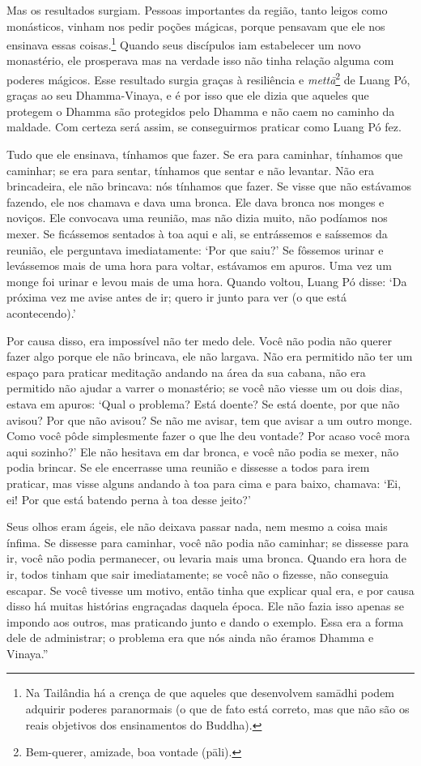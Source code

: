 Mas os resultados surgiam. Pessoas importantes da região, tanto leigos
como monásticos, vinham nos pedir poções mágicas, porque pensavam que
ele nos ensinava essas coisas.\footnote{Na Tailândia há a crença de que
  aqueles que desenvolvem samādhi podem adquirir poderes paranormais (o
  que de fato está correto, mas que não são os reais objetivos dos
  ensinamentos do Buddha).} Quando seus discípulos iam estabelecer um
novo monastério, ele prosperava mas na verdade isso não tinha relação
alguma com poderes mágicos. Esse resultado surgia graças à resiliência e
\emph{mettā}\footnote{Bem-querer, amizade, boa vontade (pāli).} de Luang
Pó, graças ao seu Dhamma-Vinaya, e é por isso que ele dizia que aqueles
que protegem o Dhamma são protegidos pelo Dhamma e não caem no caminho
da maldade. Com certeza será assim, se conseguirmos praticar como Luang
Pó fez.

Tudo que ele ensinava, tínhamos que fazer. Se era para caminhar,
tínhamos que caminhar; se era para sentar, tínhamos que sentar e não
levantar. Não era brincadeira, ele não brincava: nós tínhamos que fazer.
Se visse que não estávamos fazendo, ele nos chamava e dava uma bronca.
Ele dava bronca nos monges e noviços. Ele convocava uma reunião, mas não
dizia muito, não podíamos nos mexer. Se ficássemos sentados à toa aqui e
ali, se entrássemos e saíssemos da reunião, ele perguntava
imediatamente: `Por que saiu?' Se fôssemos urinar e levássemos mais de
uma hora para voltar, estávamos em apuros. Uma vez um monge foi urinar e
levou mais de uma hora. Quando voltou, Luang Pó disse: `Da próxima vez
me avise antes de ir; quero ir junto para ver (o que está acontecendo).'

Por causa disso, era impossível não ter medo dele. Você não podia não
querer fazer algo porque ele não brincava, ele não largava. Não era
permitido não ter um espaço para praticar meditação andando na área da
sua cabana, não era permitido não ajudar a varrer o monastério; se você
não viesse um ou dois dias, estava em apuros: `Qual o problema? Está
doente? Se está doente, por que não avisou? Por que não avisou? Se não
me avisar, tem que avisar a um outro monge. Como você pôde simplesmente
fazer o que lhe deu vontade? Por acaso você mora aqui sozinho?' Ele não
hesitava em dar bronca, e você não podia se mexer, não podia brincar. Se
ele encerrasse uma reunião e dissesse a todos para irem praticar, mas
visse alguns andando à toa para cima e para baixo, chamava: `Ei, ei! Por
que está batendo perna à toa desse jeito?'

Seus olhos eram ágeis, ele não deixava passar nada, nem mesmo a coisa
mais ínfima. Se dissesse para caminhar, você não podia não caminhar; se
dissesse para ir, você não podia permanecer, ou levaria mais uma bronca.
Quando era hora de ir, todos tinham que sair imediatamente; se você não
o fizesse, não conseguia escapar. Se você tivesse um motivo, então tinha
que explicar qual era, e por causa disso há muitas histórias engraçadas
daquela época. Ele não fazia isso apenas se impondo aos outros, mas
praticando junto e dando o exemplo. Essa era a forma dele de
administrar; o problema era que nós ainda não éramos Dhamma e Vinaya.''

